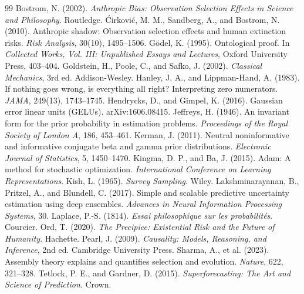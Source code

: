 \documentclass[11pt]{article}
\theoremstyle{remark}
\begin{document}
\begin{thebibliography}{99}
\small
{} Bostrom, N. (2002). \emph{Anthropic Bias: Observation Selection Effects in Science and Philosophy}. Routledge.
 \'Cirkovi\'c, M. M., Sandberg, A., and Bostrom, N. (2010). Anthropic shadow: Observation selection effects and human extinction risks. \emph{Risk Analysis}, 30(10), 1495--1506.
 G\"odel, K. (1995). Ontological proof. In \emph{Collected Works, Vol. III: Unpublished Essays and Lectures}, Oxford University Press, 403--404.
 Goldstein, H., Poole, C., and Safko, J. (2002). \emph{Classical Mechanics}, 3rd ed. Addison-Wesley.
 Hanley, J. A., and Lippman-Hand, A. (1983). If nothing goes wrong, is everything all right? Interpreting zero numerators. \emph{JAMA}, 249(13), 1743--1745.
 Hendrycks, D., and Gimpel, K. (2016). Gaussian error linear units (GELUs). arXiv:1606.08415.
 Jeffreys, H. (1946). An invariant form for the prior probability in estimation problems. \emph{Proceedings of the Royal Society of London A}, 186, 453--461.
 Kerman, J. (2011). Neutral noninformative and informative conjugate beta and gamma prior distributions. \emph{Electronic Journal of Statistics}, 5, 1450--1470.
 Kingma, D. P., and Ba, J. (2015). Adam: A method for stochastic optimization. \emph{International Conference on Learning Representations}.
 Kish, L. (1965). \emph{Survey Sampling}. Wiley.
 Lakshminarayanan, B., Pritzel, A., and Blundell, C. (2017). Simple and scalable predictive uncertainty estimation using deep ensembles. \emph{Advances in Neural Information Processing Systems}, 30.
 Laplace, P.-S. (1814). \emph{Essai philosophique sur les probabilit\'es}. Courcier.
 Ord, T. (2020). \emph{The Precipice: Existential Risk and the Future of Humanity}. Hachette.
 Pearl, J. (2009). \emph{Causality: Models, Reasoning, and Inference}, 2nd ed. Cambridge University Press.
 Sharma, A., et al. (2023). Assembly theory explains and quantifies selection and evolution. \emph{Nature}, 622, 321--328.
 Tetlock, P. E., and Gardner, D. (2015). \emph{Superforecasting: The Art and Science of Prediction}. Crown.
\end{thebibliography}
\end{document}
